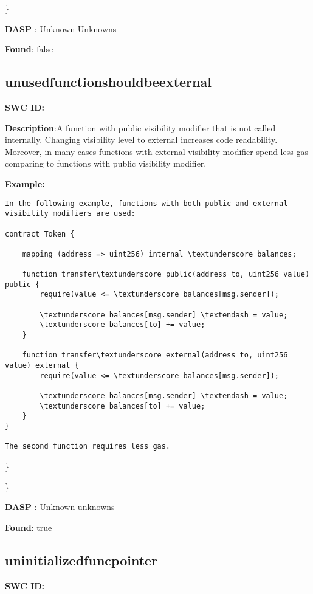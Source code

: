 \documentclass{article}
\begin{document}
\} 

\textbf{DASP} : Unknown Unknowns

\textbf{Found}: false

\subsection{unused\textunderscore function\textunderscore should\textunderscore be\textunderscore external} 
\textbf{SWC \textunderscore ID:} 

\textbf{Description}:A function with public visibility modifier that is not called internally. Changing visibility level to external increases code readability. Moreover, in many cases functions with external visibility modifier spend less gas comparing to functions with public visibility modifier.


\textbf{Example:} 
\begin{verbatim}
In the following example, functions with both public and external visibility modifiers are used:

contract Token {

    mapping (address => uint256) internal \textunderscore balances;

    function transfer\textunderscore public(address to, uint256 value) public {
        require(value <= \textunderscore balances[msg.sender]);

        \textunderscore balances[msg.sender] \textendash = value;
        \textunderscore balances[to] += value;
    }

    function transfer\textunderscore external(address to, uint256 value) external {
        require(value <= \textunderscore balances[msg.sender]);

        \textunderscore balances[msg.sender] \textendash = value;
        \textunderscore balances[to] += value;
    }
}

The second function requires less gas.

\end{verbatim}\} 

\} 

\textbf{DASP} : Unknown unknowns

\textbf{Found}: true

\subsection{uninitialized\textunderscore func\textunderscore pointer} 
\textbf{SWC \textunderscore ID:} 
\end{document}
